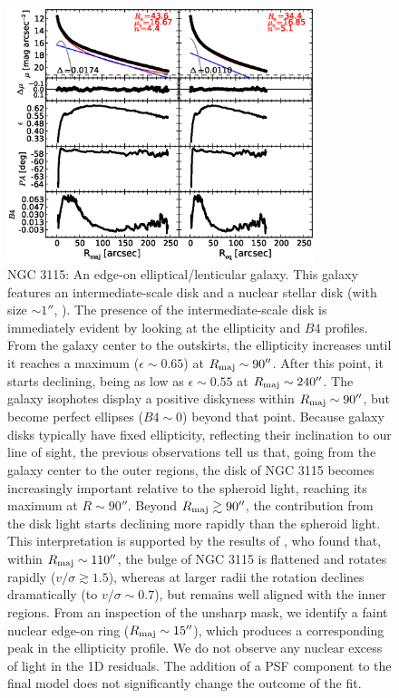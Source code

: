 \documentclass[preprint2]{emulateapj}
\newcommand{\fitfigurewidth}{0.8\textwidth}
\begin{document}
  \begin{figure}[h]
  \begin{center}
  \includegraphics[width=\fitfigurewidth]{images/n3115_1Dfit.eps}
  \caption{NGC 3115:
  An edge-on elliptical/lenticular galaxy. 
  This galaxy features an intermediate-scale disk and a nuclear stellar disk (with size $\sim 1''$, \citealt{scorzabender1995,ledo2010}).
  The presence of the intermediate-scale disk 
  is immediately evident by looking at the ellipticity and $B4$ profiles.
  From the galaxy center to the outskirts, the ellipticity increases until it reaches a maximum 
  ($\epsilon \sim 0.65$) at $R_{\rm maj} \sim 90''$. 
  After this point, it starts declining, being as low as $\epsilon \sim 0.55$ at $R_{\rm maj} \sim 240''$. 
  The galaxy isophotes display a positive diskyness within $R_{\rm maj} \sim 90''$, but become perfect ellipses 
  ($B4 \sim 0$) beyond that point.
  Because galaxy disks typically have fixed ellipticity, reflecting their inclination to our line of sight,
  the previous observations tell us that, going from the galaxy center to the outer regions,
  the disk of NGC 3115 becomes increasingly important relative to the spheroid light, reaching its maximum at $R \sim 90''$.
  Beyond $R_{\rm maj} \gtrsim 90''$, the contribution from the disk light starts declining more rapidly than the spheroid light.
  This interpretation is supported by the results of \cite{arnold2011n3115},
  who found that, within $R_{\rm maj} \sim 110''$, the bulge of NGC 3115 is flattened and rotates rapidly ($v/\sigma \gtrsim 1.5$),
  whereas at larger radii the rotation declines dramatically (to $v/\sigma \sim 0.7$), 
  but remains well aligned with the inner regions. 
  From an inspection of the unsharp mask, we identify a faint nuclear edge-on ring ($R_{\rm maj} \sim 15''$), 
  which produces a corresponding peak in the ellipticity profile. 
  We do not observe any nuclear excess of light in the 1D residuals. 
  The addition of a PSF component to the final model does not significantly change the outcome of the fit. 
  }
  \end{center}
  \end{figure}
\end{document}

